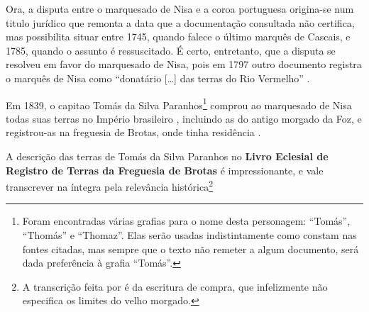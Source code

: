 Ora, a disputa entre o marquesado de Nisa e a coroa portuguesa origina-se num titulo jurídico que remonta a data que a documentação consultada não certifica, mas possibilita situar entre 1745, quando falece o último marquês de Cascais, e 1785, quando o assunto é ressuscitado. É certo, entretanto, que a disputa se resolveu em favor do marquesado de Nisa, pois em 1797 outro documento registra o marquês de Nisa como ``donatário [\dots] das terras do Rio Vermelho'' \cite[p.~543]{ramiz_expos_1881}.

Em 1839, o capitao Tomás da Silva Paranhos\footnote{Foram encontradas várias grafias para o nome desta personagem: ``Tomás'', ``Thomás'' e ``Thomaz''. Elas serão usadas indistintamente como constam nas fontes citadas, mas sempre que o texto não remeter a algum documento, será dada preferência à grafia ``Tomás''.} comprou ao marquesado de Nisa todas suas terras no Império brasileiro \cite[pp.~III-7 - III-12]{teixeira_doacoes_1978}, incluindo as do antigo morgado da Foz, e registrou-as na freguesia de Brotas, onde tinha residência \cite[p.~10]{ott_engenhos_1996}. 

A descrição das terras de Tomás da Silva Paranhos no \textbf{Livro Eclesial de Registro de Terras da Freguesia de Brotas} é impressionante, e vale transcrever na íntegra pela relevância histórica\footnote{A transcrição feita por  é da escritura de compra, que infelizmente não especifica os limites do velho morgado.}

